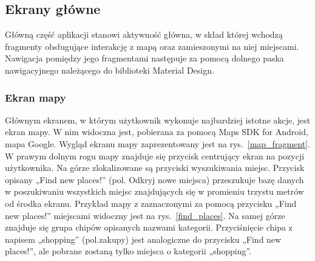 \newpage
    \subsection{Ekrany główne}
    Główną część aplikacji stanowi aktywność główna, w skład której wchodzą fragmenty obsługujące interakcję z mapą oraz zamieszonymi na niej miejscami.
    Nawigacja pomiędzy jego fragmentami następuje za pomocą dolnego paska nawigacyjnego należącego do biblioteki Material Design.

    \vspace{1cm}
        \subsubsection{Ekran mapy}
        Głównym ekranem, w którym użytkownik wykonuje najbardziej istotne akcje, jest ekran mapy. W nim widoczna jest, pobierana za pomocą Maps SDK for Android, mapa Google.
        Wygląd ekranu mapy zaprezentowany jest na rys.~\ref{map_fragment}. W prawym dolnym rogu mapy znajduje się przycisk centrujący ekran na pozycji użytkownika. Na górze 
        zlokalizowane są przyciski wyszukiwania miejsc. Przycisk opisany „Find new places!” (pol. Odkryj nowe miejsca) przeszukuje bazę danych w poszukiwaniu wszystkich miejsc 
        znajdujących się w promieniu trzystu metrów od środka ekranu. Przykład mapy z zaznaczonymi za pomocą przycisku „Find new places!” miejscami widoczny jest na rys.~\ref{find_places}.
        Na samej górze znajduje się grupa chipów opisanych nazwami kategorii. Przyciśnięcie chipa z napisem „shopping” (pol.\@ zakupy) jest analogiczne do przycisku „Find new places!”, ale pobrane
        zostaną tylko miejsca o kategorii „shopping”. 

